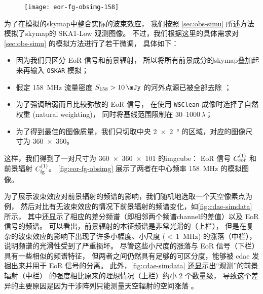 \begin{figure}[htp]
  \centering
  \texttt{[image: eor-fg-obsimg-158]}
  \label{fig:eor-fg-obsimg}
\end{figure}

为了在模拟的\ac{skymap}中整合实际的波束效应，
我们按照 \autoref{sec:obs-simu} 所述方法模拟了\ac{skymap}的 SKA1-Low 观测图像。
不过，我们根据这里的具体需求对 \autoref{sec:obs-simu} 的模拟方法进行了若干微调，
具体如下：
\begin{itemize}
  \item 因为我们只区分 EoR 信号和前景辐射，
    所以将所有前景成分的\ac{skymap}叠加起来再输入 \texttt{OSKAR} 模拟；
  \item 假定 \SI{158}{\MHz} 流量密度 $S_{158} > \SI{10}{\mJy}$
    的河外点源已被全部去除 \cite{liu2009ps}；
  \item 为了强调暗弱而且比较弥散的 EoR 信号，
    在使用 \texttt{WSClean} 成像时选择了自然权重 (natural weighting)，
    同时将基线范围限制在 \numrange{30}{1000}$\,\lambda$；
  \item 为了得到最佳的图像质量，我们只切取中央 \SI{2 x 2}{\degree}
    的区域，对应的图像尺寸为 \num{360 x 360}。
\end{itemize}
这样，我们得到了一对尺寸为 \num{360 x 360 x 101} 的\ac{imgcube}：
EoR 信号 $C_{\mathrm{eor}}^{(1)}$ 和前景辐射 $C_{\mathrm{fg}}^{(1)}$。
\autoref{fig:eor-fg-obsimg} 展示了两者在中心频率 \SI{158}{\MHz} 的模拟图像。

为了展示波束效应对前景辐射的频谱的影响，我们随机地选取一个天空像素点为例，
然后对比有无波束效应的情况下前景辐射的频谱变化，如\autoref{fig:cdae-simdata} 所示，
其中还显示了相应的差分频谱（即相邻两个频谱\ac{channel}的差值）以及 EoR 信号的频谱。
可以看出，前景辐射的本征频谱是非常光滑的（上栏），
但是在复杂的波束效应的影响下出现了许多小幅度、小尺度 ($<$\,\SI{1}{\MHz}) 的涨落（中栏），
说明频谱的光滑性受到了严重损坏。
尽管这些小尺度的涨落与 EoR 信号（下栏）具有一些相似的频谱特征，
但两者之间仍然具有足够的可区分度，能够被 \ac{cdae} 发掘出来并用于 EoR 信号的分离。
此外，\autoref{fig:cdae-simdata} 还显示出\enquote{观测}的前景辐射（中栏）
的强度相比原来的理想情况（上栏）约小 2 个数量级，
导致这个差异的主要原因是因为干涉阵列只能测量天空辐射的空间涨落 \cite{braun1985}。

